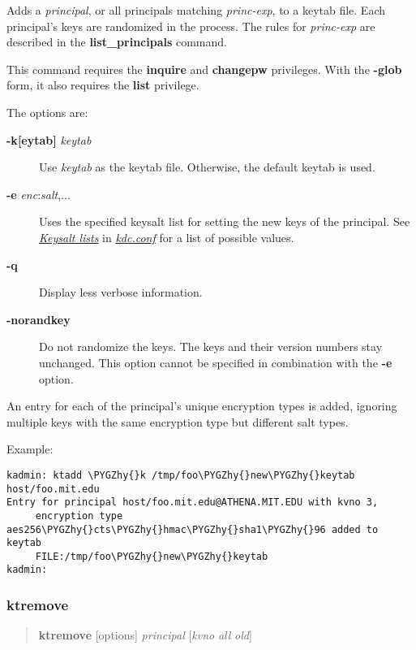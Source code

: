 \documentclass[letterpaper,10pt,english]{sphinxmanual}
\def\PYGZhy{\char`\-}
\begin{document}
Adds a \emph{principal}, or all principals matching \emph{princ-exp}, to a
keytab file.  Each principal's keys are randomized in the process.
The rules for \emph{princ-exp} are described in the \textbf{list\_principals}
command.

This command requires the \textbf{inquire} and \textbf{changepw} privileges.
With the \textbf{-glob} form, it also requires the \textbf{list} privilege.

The options are:
\begin{description}
\item[{\textbf{-k{[}eytab{]}} \emph{keytab}}] \leavevmode
Use \emph{keytab} as the keytab file.  Otherwise, the default keytab is
used.

\item[{\textbf{-e} \emph{enc}:\emph{salt},...}] \leavevmode
Uses the specified keysalt list for setting the new keys of the
principal.  See {\hyperref[admin/conf_files/kdc_conf:keysalt-lists]{\emph{Keysalt lists}}} in {\hyperref[admin/conf_files/kdc_conf:kdc-conf-5]{\emph{kdc.conf}}} for a
list of possible values.

\item[{\textbf{-q}}] \leavevmode
Display less verbose information.

\item[{\textbf{-norandkey}}] \leavevmode
Do not randomize the keys. The keys and their version numbers stay
unchanged.  This option cannot be specified in combination with the
\textbf{-e} option.

\end{description}

An entry for each of the principal's unique encryption types is added,
ignoring multiple keys with the same encryption type but different
salt types.

Example:

\begin{Verbatim}[commandchars=\\\{\}]
kadmin: ktadd \PYGZhy{}k /tmp/foo\PYGZhy{}new\PYGZhy{}keytab host/foo.mit.edu
Entry for principal host/foo.mit.edu@ATHENA.MIT.EDU with kvno 3,
     encryption type aes256\PYGZhy{}cts\PYGZhy{}hmac\PYGZhy{}sha1\PYGZhy{}96 added to keytab
     FILE:/tmp/foo\PYGZhy{}new\PYGZhy{}keytab
kadmin:
\end{Verbatim}
\label{admin/admin_commands/kadmin_local:ktadd-end}

\subsubsection{ktremove}
\label{admin/admin_commands/kadmin_local:id18}\label{admin/admin_commands/kadmin_local:ktremove}\label{admin/admin_commands/kadmin_local:ktadd-end}\begin{quote}

\textbf{ktremove} {[}options{]} \emph{principal} {[}\emph{kvno} \textbar{} \emph{all} \textbar{} \emph{old}{]}
\end{quote}
\end{document}

